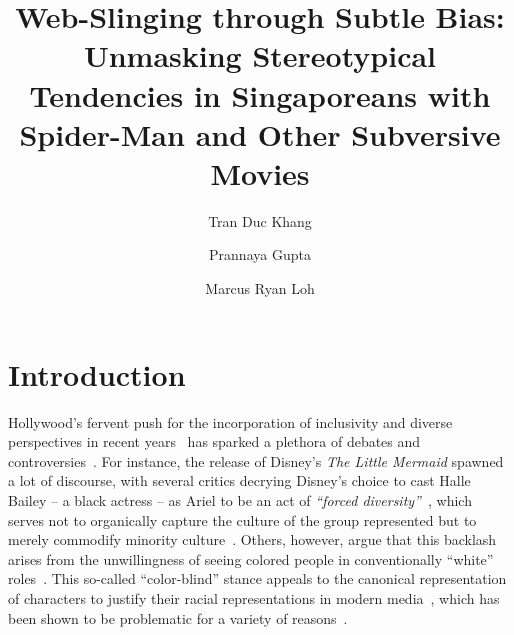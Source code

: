 \documentclass[%
 reprint,
 amsmath,amssymb,
 12pt,
rmp,
]{revtex4-2}
\begin{document}
\pagestyle{fancy}


\title{Web-Slinging through Subtle Bias: Unmasking Stereotypical Tendencies in Singaporeans with Spider-Man and Other Subversive Movies}

\author{Tran Duc Khang}%
\author{Prannaya Gupta}%
\author{Marcus Ryan Loh}%
 






\maketitle


\section{\label{sec:introduction}Introduction}


Hollywood’s fervent push for the incorporation of inclusivity and diverse perspectives in recent years~\cite{ramon_film_2021} has sparked a plethora of debates and controversies~\cite{fu_fear_2015, romano_racist_2022, howard_spider-man_2016}. For instance, the release of Disney’s \emph{The Little Mermaid} spawned a lot of discourse, with several critics decrying Disney’s choice to cast Halle Bailey – a black actress – as Ariel to be an act of \emph{“forced diversity”}~\cite{romano_racist_2022}, which serves not to organically capture the culture of the group represented but to merely commodify minority culture~\cite{gray_performing_2018, great_bury_2023}. Others, however, argue that this backlash arises from the unwillingness of seeing colored people in conventionally “white” roles~\cite{sabater2022}. This so-called “color-blind” stance appeals to the canonical representation of characters to justify their racial representations in modern media~\cite{fu_fear_2015}, which has been shown to be problematic for a variety of reasons~\cite{fu_fear_2015, bonilla_linguistics_2002, history_segregation_2023}.
\end{document}
